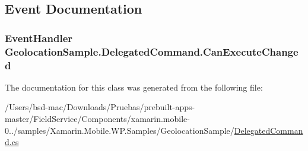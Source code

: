 \subsection{Event Documentation}
\hypertarget{class_geolocation_sample_1_1_delegated_command_a8728d1df6541d43f2944e0edf336db25}{
\subsubsection[{Can\+Execute\+Changed}]{\setlength{\rightskip}{0pt plus 5cm}Event\+Handler Geolocation\+Sample.\+Delegated\+Command.\+Can\+Execute\+Changed}}\label{class_geolocation_sample_1_1_delegated_command_a8728d1df6541d43f2944e0edf336db25}


The documentation for this class was generated from the following file\+:\begin{DoxyCompactItemize}
\item 
/\+Users/bsd-\/mac/\+Downloads/\+Pruebas/prebuilt-\/apps-\/master/\+Field\+Service/\+Components/xamarin.\+mobile-\/0../samples/\+Xamarin.\+Mobile.\+W\+P.\+Samples/\+Geolocation\+Sample/\hyperlink{_geolocation_sample_2_delegated_command_8cs}{Delegated\+Command.\+cs}\end{DoxyCompactItemize}
